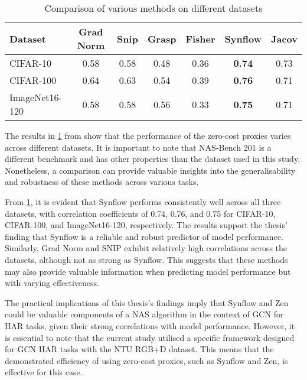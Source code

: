 \begin{table}[ht]
\caption{Comparison of various methods on different datasets}
\centering
\begin{adjustbox}{center}
{\footnotesize
\begin{tabular}{l|cccccc}
\textbf{Dataset} & \textbf{Grad Norm} & \textbf{Snip} & \textbf{Grasp} & \textbf{Fisher} & \textbf{Synflow} & \textbf{Jacov} \\ \hline
\multicolumn{1}{l|}{CIFAR-10} & 0.58 & 0.58 & 0.48 & 0.36 & \textbf{0.74} & 0.73 \\
\multicolumn{1}{l|}{\cellcolor{verylightgray}CIFAR-100} & \cellcolor{verylightgray}0.64 & \cellcolor{verylightgray}0.63 & \cellcolor{verylightgray}0.54 & \cellcolor{verylightgray}0.39 & \cellcolor{verylightgray}\textbf{0.76} & \cellcolor{verylightgray}0.71 \\
\multicolumn{1}{l|}{ImageNet16-120} & 0.58 & 0.58 & 0.56 & 0.33 & \textbf{0.75} & 0.71 \\
\end{tabular}
}
\end{adjustbox}
\label{tab:comparison}
\end{table}

The results in \cref{tab:comparison} from \cite{abdelfattah2021zero} show that the performance of the zero-cost proxies varies across different datasets. It is important to note that \gls{NAS}-Bench 201 is a different benchmark and has other properties than the dataset used in this study. Nonetheless, a comparison can provide valuable insights into the generalisability and robustness of these methods across various tasks.

From \cref{tab:comparison}, it is evident that \gls{Synflow} performs consistently well across all three datasets, with correlation coefficients of 0.74, 0.76, and 0.75 for CIFAR-10, CIFAR-100, and ImageNet16-120, respectively. The results support the thesis' finding that \gls{Synflow} is a reliable and robust predictor of model performance. Similarly, Grad Norm and \gls{SNIP} exhibit relatively high correlations across the datasets, although not as strong as \gls{Synflow}. This suggests that these methods may also provide valuable information when predicting model performance but with varying effectiveness.

The practical implications of this thesis's findings imply that \gls{Synflow} and Zen could be valuable components of a \gls{NAS} algorithm in the context of \gls{GCN} for \gls{HAR} tasks, given their strong correlations with model performance. However, it is essential to note that the current study utilised a specific framework designed for \gls{GCN} \gls{HAR} tasks with the NTU RGB+D dataset. This means that the demonstrated efficiency of using zero-cost proxies, such as \gls{Synflow} and Zen, is effective for this case.

